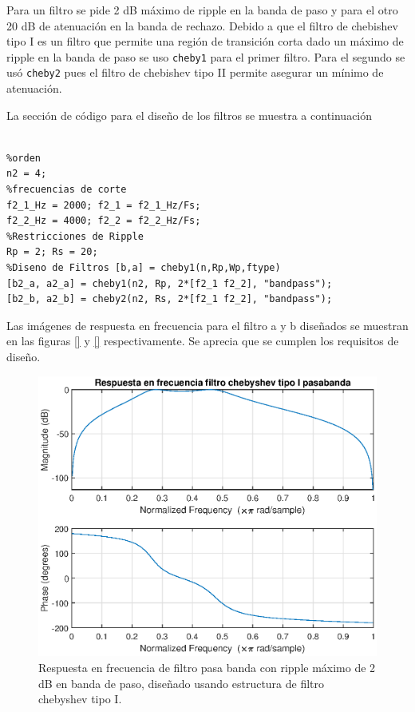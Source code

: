 \begin{enumerate}
Para un filtro se pide 2 dB máximo de ripple en la banda de paso y para el otro 20 dB de atenuación en la banda de rechazo. Debido a que el filtro de chebishev tipo I es un filtro que permite una región de transición corta dado un máximo de ripple en la banda de paso se uso \texttt{cheby1} para el primer filtro. Para el segundo se usó \texttt{cheby2} pues el filtro de chebishev tipo II  permite asegurar un mínimo de atenuación.

La sección de código para el diseño de los filtros se muestra a continuación

\begin{lstlisting}[frame=single]
%% 2. Diseno de filtros chebyshev tipo I y II

%orden
n2 = 4;
%frecuencias de corte
f2_1_Hz = 2000; f2_1 = f2_1_Hz/Fs;
f2_2_Hz = 4000; f2_2 = f2_2_Hz/Fs;
%Restricciones de Ripple
Rp = 2; Rs = 20;
%Diseno de Filtros [b,a] = cheby1(n,Rp,Wp,ftype)
[b2_a, a2_a] = cheby1(n2, Rp, 2*[f2_1 f2_2], "bandpass");
[b2_b, a2_b] = cheby2(n2, Rs, 2*[f2_1 f2_2], "bandpass");
\end{lstlisting}

Las imágenes de respuesta en frecuencia para el filtro a y b diseñados se muestran en las figuras \ref{} y \ref{} respectivamente. Se aprecia que se cumplen los requisitos de diseño.

\begin{figure}[H]
    \centering
    \includegraphics[width = .8\linewidth]{Figuras/p4_2a.eps}
    \caption{Respuesta en frecuencia de filtro pasa banda con ripple máximo de 2 dB en banda de paso, diseñado usando estructura de filtro chebyshev tipo I.}
    \label{fig:p4_2a}
\end{figure}


\end{enumerate}
